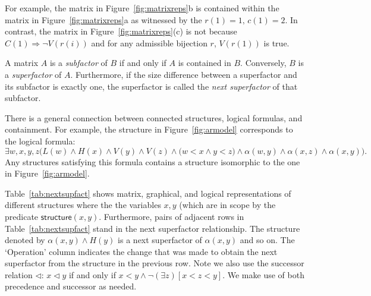 \documentclass[pmlr]{jmlr}%
\newcommand{\hijeff}[1]{%
	\textcolor{violet}{\textbf{[#1]}}%
}
\newcommand{\hihan}[1]{%
	\textcolor{orange}{\textbf{[#1]}}%
}
\begin{document}
	\vspace{2ex}
	
	For example, the matrix in Figure~\ref{fig:matrixreps}b is contained within the matrix in Figure~\ref{fig:matrixreps}a as witnessed by the  \(r(1)=1,\, c(1)=2\). In contrast, the matrix in Figure~\ref{fig:matrixreps}(c) is not because \(C(1)\Rightarrow \neg V(r(i))\) and for any admissible bijection \(r\), \(V(r(1))\) is true.
	
	A matrix \(A\) is a \emph{subfactor} of \(B\) if and only if \(A\) is 
	contained in \(B\). Conversely, \(B\) is a \emph{superfactor} of \(A\).
	Furthermore, if the size difference between a superfactor and its
	subfactor is exactly one, the superfactor is called the
	\emph{next superfactor} of that subfactor.
	
	
	There is a general connection between connected structures, logical formulas, and containment. For example, the structure in Figure~\ref{fig:armodel} corresponds to the logical formula:
	\[  \exists w,x,y,z \big(
	L(w)\land H(x)\land V(y)\land V(z)
	\land \big(w<x \land y<z\big)
	\land \alpha(w,y)\land \alpha(x,z) \land \alpha(x,y)
	\big).
	\]
	Any structures satisfying this formula contains a structure isomorphic to the one in Figure~\ref{fig:armodel}.
	
	Table~\ref{tab:nextsupfact} shows matrix, graphical, and logical representations of different structures where the the variables \(x,y\) (which are in scope by the predicate \(\textsf{structure}(x,y)\). Furthermore, pairs of adjacent rows in  Table~\ref{tab:nextsupfact} stand in the next superfactor relationship. The structure denoted by \(\alpha(x,y)\land H(y)\) is a next superfactor of \(\alpha(x,y)\) and so on. The `Operation' column indicates the change that was made to obtain the next superfactor from the structure in the previous row.
	Note we also use the successor relation \(\lhd\): \(x\lhd y\) if and only if \(x<y \wedge \neg (\exists z)[ x< z < y] \). We make use of both precedence and successor as needed.
	
	
\end{document}
